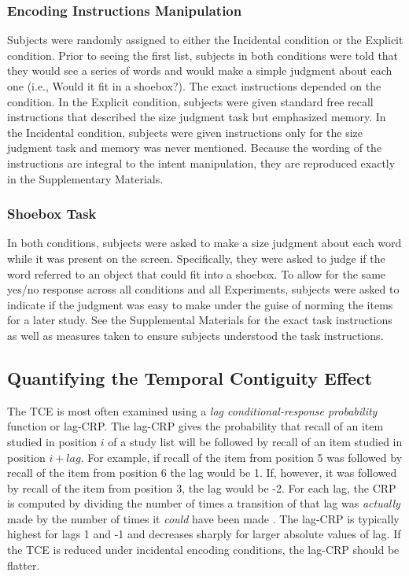 \documentclass[man,natbib,floatsintext]{apa6} %
\begin{document}
\subsubsection{Encoding Instructions Manipulation} Subjects were randomly assigned to either the Incidental condition or the Explicit condition. Prior to seeing the first list, subjects in both conditions were told that they would see a series of words and would make a simple judgment about each one (i.e., Would it fit in a shoebox?). The exact instructions depended on the condition. In the Explicit condition, subjects were given standard free recall instructions that described the size judgment task but emphasized memory. In the Incidental condition, subjects were given instructions only for the size judgment task and memory was never mentioned. Because the wording of the instructions are integral to the intent manipulation, they are reproduced exactly in the Supplementary Materials.

\subsubsection{Shoebox Task} In both conditions, subjects were asked to make a size judgment about each word while it was present on the screen. Specifically, they were asked  to judge if the word referred to an object that could fit into a shoebox. To allow for the same yes/no response across all conditions and all Experiments, subjects were asked to indicate if the judgment was easy to make under the guise of norming the items for a later study. See the Supplemental Materials for the exact task instructions as well as measures taken to ensure subjects understood the task instructions.

\subsection{Quantifying the Temporal Contiguity Effect} The TCE is most often examined using a \textit{lag conditional-response probability} function or lag-CRP. The lag-CRP gives the probability that recall of an item studied in position $i$ of a study list will be followed by recall of an item studied in position $i+lag$. For example, if recall of the item from position 5 was followed by recall of the item from position 6 the lag would be 1. If, however, it was followed by recall of the item from position 3, the lag would be -2. For each lag, the CRP is computed by dividing the number of times a transition of that lag was \emph{actually} made by the number of times it \emph{could} have been made \citep[e.g., it could not have been made if the item $i+lag$ was already recalled;][]{Kaha96}. The lag-CRP is typically highest for lags 1 and -1 and decreases sharply for larger absolute values of lag. If the TCE is reduced under incidental encoding conditions, the lag-CRP should be flatter.
\end{document}
